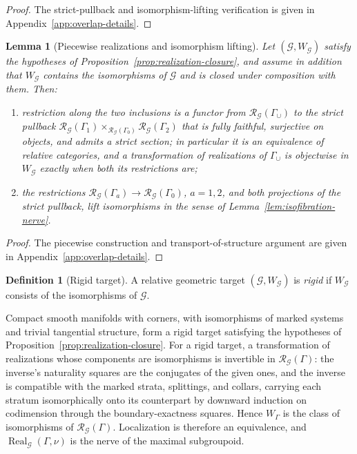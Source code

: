\documentclass[11pt,letterpaper,twoside]{article}
\theoremstyle{plain}
\newtheorem{lemma}[theorem]{Lemma}
\theoremstyle{definition}
\newtheorem{definition}[theorem]{Definition}
\theoremstyle{remark}
\newcommand{\Real}{\operatorname{Real}}
\begin{document}
\begin{proof}
The strict-pullback and isomorphism-lifting verification is given in Appendix~\ref{app:overlap-details}.
\end{proof}

\begin{lemma}[Piecewise realizations and isomorphism lifting]\label{lem:piecewise-realizations}
Let \((\mathcal G,W_{\mathcal G})\) satisfy the hypotheses of Proposition~\ref{prop:realization-closure}, and assume in addition that \(W_{\mathcal G}\) contains the isomorphisms of \(\mathcal G\) and is closed under composition with them.  Then:
\begin{enumerate}
\item restriction along the two inclusions is a functor from \(\mathcal R_{\mathcal G}(\Gamma_\cup)\) to the strict pullback \(\mathcal R_{\mathcal G}(\Gamma_1)\times_{\mathcal R_{\mathcal G}(\Gamma_0)}\mathcal R_{\mathcal G}(\Gamma_2)\) that is fully faithful, surjective on objects, and admits a strict section; in particular it is an equivalence of relative categories, and a transformation of realizations of \(\Gamma_\cup\) is objectwise in \(W_{\mathcal G}\) exactly when both its restrictions are;
\item the restrictions \(\mathcal R_{\mathcal G}(\Gamma_a)\to\mathcal R_{\mathcal G}(\Gamma_0)\), \(a=1,2\), and both projections of the strict pullback, lift isomorphisms in the sense of Lemma~\ref{lem:isofibration-nerve}.
\end{enumerate}
\end{lemma}

\begin{proof}
The piecewise construction and transport-of-structure argument are given in Appendix~\ref{app:overlap-details}.
\end{proof}

\begin{definition}[Rigid target]\label{def:rigid-target}
A relative geometric target \((\mathcal G,W_{\mathcal G})\) is \emph{rigid} if \(W_{\mathcal G}\) consists of the isomorphisms of \(\mathcal G\).
\end{definition}

Compact smooth manifolds with corners, with isomorphisms of marked systems and trivial tangential structure, form a rigid target satisfying the hypotheses of Proposition~\ref{prop:realization-closure}.  For a rigid target, a transformation of realizations whose components are isomorphisms is invertible in \(\mathcal R_{\mathcal G}(\Gamma)\): the inverse's naturality squares are the conjugates of the given ones, and the inverse is compatible with the marked strata, splittings, and collars, carrying each stratum isomorphically onto its counterpart by downward induction on codimension through the boundary-exactness squares.  Hence \(W_\Gamma\) is the class of isomorphisms of \(\mathcal R_{\mathcal G}(\Gamma)\).  Localization is therefore an equivalence, and \(\Real_{\mathcal G}(\Gamma,\nu)\) is the nerve of the maximal subgroupoid.
\end{document}
